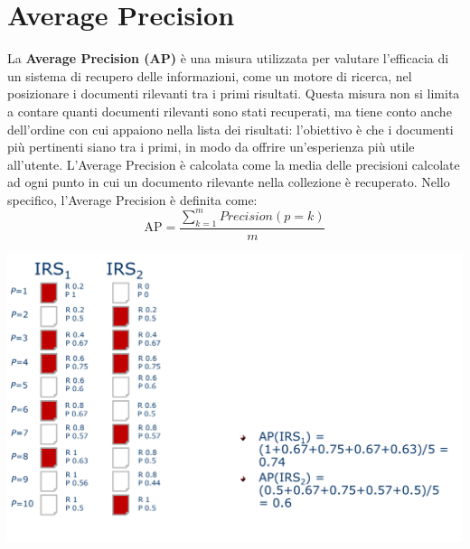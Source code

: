 \documentclass{report}
\begin{document}
	\section{Average Precision}
	La \textbf{Average Precision (AP)} è una misura utilizzata per valutare l’efficacia di un sistema di recupero delle informazioni, come un motore di ricerca, nel posizionare i documenti rilevanti tra i primi risultati. Questa misura non si limita a contare quanti documenti rilevanti sono stati recuperati, ma tiene conto anche dell’ordine con cui appaiono nella lista dei risultati: l’obiettivo è che i documenti più pertinenti siano tra i primi, in modo da offrire un’esperienza più utile all’utente. L’Average Precision è calcolata come la media delle precisioni calcolate ad ogni punto in cui un documento rilevante nella collezione è recuperato. Nello specifico, l’Average Precision è definita come:
	\[
		\text{AP} = \frac{\sum_{k=1}^{m} Precision(p=k)}{m}
	\]
	\begin{center}
		\includegraphics[scale=0.3]{assets/average-precision.png}
	\end{center}
\end{document}
